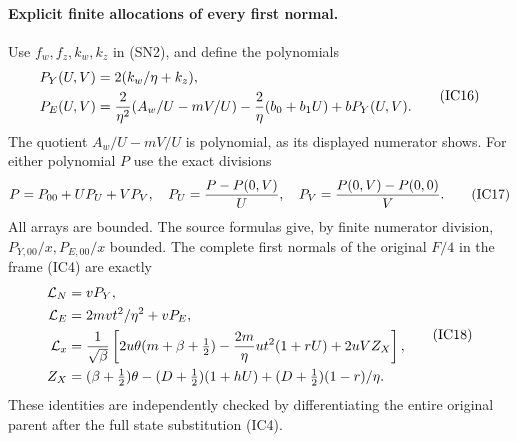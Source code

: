 \paragraph{Explicit finite allocations of every first normal.}
Use $f_w,f_z,k_w,k_z$ in (SN2), and define the polynomials
\[
\begin{aligned}
 P_Y(U,V)&=2(k_w/\eta+k_z),\\
 P_E(U,V)&={2\over\eta^2}(A_w/U-mV/U)
              -{2\over\eta}(b_0+b_1U)+bP_Y(U,V).
\end{aligned}                                                   \tag{IC16}
\]
The quotient $A_w/U-mV/U$ is polynomial, as its displayed numerator
shows. For either polynomial $P$ use the exact divisions
\[
 P=P_{00}+UP_U+VP_V,\quad
 P_U={P-P(0,V)\over U},\quad
 P_V={P(0,V)-P(0,0)\over V}.                           \tag{IC17}
\]
All arrays are bounded. The source formulas give, by finite numerator
division, $P_{Y,00}/x,P_{E,00}/x$ bounded. The complete first normals
of the original $F/4$ in the frame (IC4) are exactly
\[
\begin{aligned}
 \mathcal L_N&=vP_Y,\\
 \mathcal L_E&=2mv t^2/\eta^2+vP_E,\\
 \mathcal L_x&={1\over\sqrt\beta}\left[
 2u\theta(m+\beta+\tfrac12)
 -{2m\over\eta}ut^2(1+rU)+2uVZ_X\right],\\
 Z_X&=(\beta+\tfrac12)\theta-(D+\tfrac12)(1+hU)
                         +(D+\tfrac12)(1-r)/\eta .     \end{aligned} \tag{IC18}
\]
These identities are independently checked by differentiating the
entire original parent after the full state substitution (IC4).

